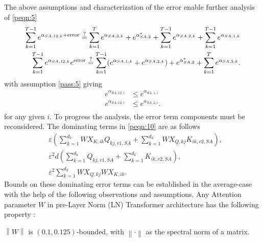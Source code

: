 The above assumptions and characterization of the error enable further analysis of \ref{peqn:5}
\begin{align}
    \sum_{k=1}^{T-1} e^{\alpha_{SA,12,k} + \text{error}}  \stackrel{?}{=} \sum_{k=1}^{T} e^{\alpha_{SA,3,k}} + e^{\alpha^*_{SA,2}} + \sum_{k=1}^{T-1} e^{\alpha_{SA,2,k}} + \sum_{k=1}^{T-1} e^{\alpha_{SA,1,k}} \nonumber \\
    \sum_{k=1}^{T-1} e^{\alpha_{SA,12,k}} e^{\text{error}}  \stackrel{?}{=} \sum_{k=1}^{T-1} (e^{\alpha_{SA,1,k}} + e^{\alpha_{SA,2,k}}) + e^{\alpha^*_{SA,2}} + \sum_{k=1}^{T} e^{\alpha_{SA,3,k}}. \label{peqn:15}
\end{align}
with assumption \ref{pass:5} giving
\begin{equation}
\begin{aligned}
    e^{\alpha_{SA,12,i}} & \leq e^{\alpha_{SA,1,i}} \\
    e^{\alpha_{SA,12,i}} & \leq e^{\alpha_{SA,2,i}}. \\
\end{aligned}
\end{equation}
for any given $i$. %
To progress the analysis, the error term components must be reconsidered. The dominating terms in \ref{peqn:10} are as follows
\begin{align}
    & \varepsilon (\sum_{k=1}^{d_k} WX_{K,ik} Q_{kj,v1,SA} + \sum_{k=1}^{d_k} WX_{Q,kj} K_{ik,v2,SA}), \label{e1} \\
    & \varepsilon^2 d (\sum_{k=1}^{d_k} Q_{kj,v1,SA} + \sum_{k=1}^{d_k} K_{ik,v2,SA}), \label{e2} \\
    & \varepsilon^2 \sum_{k=1}^{d_k} WX_{Q,kj} WX_{K,ik}. \label{e3}
\end{align}
Bounds on these dominating error terms can be established in the average-case with the help of the following observations and assumptions. Any Attention parameter $W$ in pre-Layer Norm (LN) Transformer architecture has the following property \cite{xiong2020layer}:
\begin{property}
    $\left\| W \right\|$ is $(0.1, 0.125)$-bounded, with $\left\| \cdot \right\|$ as the spectral norm of a matrix.
\label{prop:1}
\end{property}
